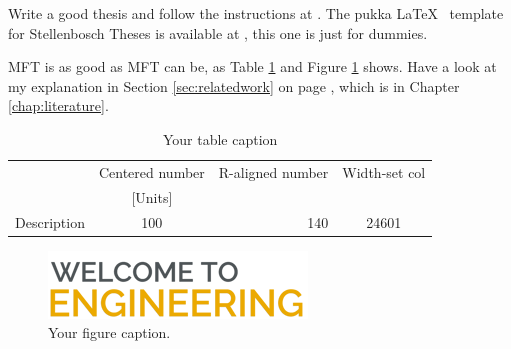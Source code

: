 Write a good thesis and follow the instructions at \cite{sun_thesis_guide}. The pukka \LaTeX ~ template for Stellenbosch Theses is available at \cite{sun_latex_template}, this one is just for dummies.


\Ac{MFT} is as good as \ac{MFT} can be, as Table \ref{tab:my_label} and Figure \ref{fig:enter-label} shows.
Have a look at my explanation in Section \ref{sec:relatedwork} on page \pageref{sec:relatedwork}, which is in Chapter \ref{chap:literature}.


\begin{table}[H]
    \caption{Your table caption}
    \footnotesize
    \centering
    \begin{tabular}{ccrp{3cm}}    %
    \toprule
         & Centered number & R-aligned number &  Width-set col\\
         & [Units] & & \\
    \midrule
        Description & 100 & 140 & \multicolumn{1}{c}{24601}\\
    \bottomrule
    \end{tabular}
    \label{tab:my_label}
\end{table}

\begin{figure}
    \centering
    \includegraphics[width=0.8\linewidth]{figures/Faculty-of-Engineering-Stellenbosch-University-Logo.png}
    \caption{Your figure caption.}
    \label{fig:enter-label}
\end{figure}
